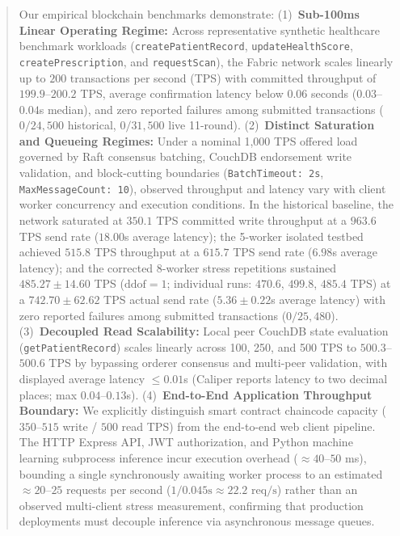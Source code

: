 \documentclass[runningheads]{llncs}
\begin{document}
\begin{abstract}
Our empirical blockchain benchmarks demonstrate: (1)~\textbf{Sub-100ms Linear Operating Regime:} Across representative synthetic healthcare benchmark workloads (\texttt{createPatientRecord}, \texttt{updateHealthScore}, \texttt{createPrescription}, and \texttt{requestScan}), the Fabric network scales linearly up to $200$ transactions per second (TPS) with committed throughput of $199.9$--$200.2$ TPS, average confirmation latency below $0.06$ seconds ($0.03$--$0.04$s median), and zero reported failures among submitted transactions ($0/24,500$ historical, $0/31,500$ live 11-round). (2)~\textbf{Distinct Saturation and Queueing Regimes:} Under a nominal 1,000 TPS offered load governed by Raft consensus batching, CouchDB endorsement write validation, and block-cutting boundaries (\texttt{BatchTimeout: 2s}, \texttt{MaxMessageCount: 10}), observed throughput and latency vary with client worker concurrency and execution conditions. In the historical baseline, the network saturated at $350.1$ TPS committed write throughput at a $963.6$ TPS send rate ($18.00$s average latency); the 5-worker isolated testbed achieved $515.8$ TPS throughput at a $615.7$ TPS send rate ($6.98$s average latency); and the corrected 8-worker stress repetitions sustained $485.27 \pm 14.60$ TPS ($\text{ddof}=1$; individual runs: $470.6$, $499.8$, $485.4$ TPS) at a $742.70 \pm 62.62$ TPS actual send rate ($5.36 \pm 0.22$s average latency) with zero reported failures among submitted transactions ($0/25,480$). (3)~\textbf{Decoupled Read Scalability:} Local peer CouchDB state evaluation (\texttt{getPatientRecord}) scales linearly across 100, 250, and 500 TPS to $500.3$--$500.6$ TPS by bypassing orderer consensus and multi-peer validation, with displayed average latency $\le 0.01$s (Caliper reports latency to two decimal places; max $0.04$--$0.13$s). (4)~\textbf{End-to-End Application Throughput Boundary:} We explicitly distinguish smart contract chaincode capacity ($350$--$515$ write / $500$ read TPS) from the end-to-end web client pipeline. The HTTP Express API, JWT authorization, and Python machine learning subprocess inference incur execution overhead ($\approx 40$--$50$ ms), bounding a single synchronously awaiting worker process to an estimated $\approx 20$--$25$ requests per second ($1 / 0.045\text{s} \approx 22.2\text{ req/s}$) rather than an observed multi-client stress measurement, confirming that production deployments must decouple inference via asynchronous message queues.


\end{abstract}
\end{document}
